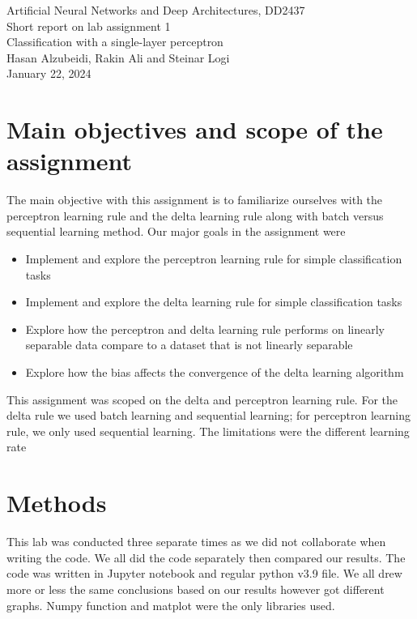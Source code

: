 \documentclass[a4paper]{article}
\begin{document}
\begin{center}
  {\large Artificial Neural Networks and Deep Architectures, DD2437}\\
  \vspace{7mm}
  {\huge Short report on lab assignment 1\\[1ex]}
  {\Large Classification with a single-layer perceptron}\\
  \vspace{8mm}  
  {\Large Hasan Alzubeidi, Rakin Ali and Steinar Logi \\}
  \vspace{4mm}
  {\large January 22, 2024 \\}
\end{center}

\section{Main objectives and scope of the assignment \normalsize}
The main objective with this assignment is to familiarize ourselves with the perceptron learning rule and the delta learning rule along with batch versus sequential learning method. 
Our major goals in the assignment were  
\begin{itemize}
\item Implement and explore the perceptron learning rule for simple classification tasks
\item Implement and explore the delta learning rule for simple classification tasks 
\item Explore how the perceptron and delta learning rule performs on linearly separable data compare to a dataset that is not linearly separable
\item Explore how the bias affects the convergence of the delta learning algorithm
\end{itemize}

This assignment was scoped on the delta and perceptron learning rule. For the delta rule we used batch learning and sequential learning; for perceptron learning rule, we only used sequential learning. The limitations were the different learning rate

\section{Methods} This lab was conducted three separate times as we did not collaborate when writing the code. We all did the code separately then compared our results. The code was written in Jupyter notebook and regular python v3.9 file. We all drew more or less the same conclusions based on our results however got different graphs. Numpy function and matplot were the only libraries used.  \\
\end{document}
